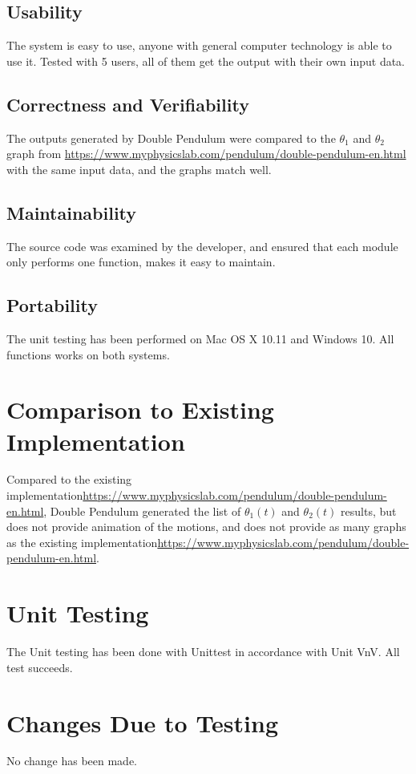 \documentclass[12pt, titlepage]{article}
\begin{document}
\subsection{Usability}
The system is easy to use, anyone with general computer technology is able to use it. Tested with 5 users, all of them get the output with their own input data. 

\subsection{Correctness and Verifiability}
The outputs generated by Double Pendulum were compared to the $\theta_1$ and $\theta_2$ graph from \url{https://www.myphysicslab.com/pendulum/double-pendulum-en.html} with the same input data, and the graphs match well. 

\subsection{Maintainability}
The source code was examined by the developer, and ensured that each module only performs one function, makes it easy to maintain.  


\subsection{Portability}
The unit testing has been performed on Mac OS X 10.11 and Windows 10. All functions works on both systems.
	
\section{Comparison to Existing Implementation}	
Compared to the existing implementation\url{https://www.myphysicslab.com/pendulum/double-pendulum-en.html}, Double Pendulum generated the list of $\theta_1(t)$ and $\theta_2(t)$ results, but does not provide animation of the motions, and does not provide as many graphs as the existing implementation\url{https://www.myphysicslab.com/pendulum/double-pendulum-en.html}. 

\section{Unit Testing}
The Unit testing has been done with Unittest in accordance with Unit VnV. All test succeeds. 

\section{Changes Due to Testing}
No change has been made. 
\end{document}
